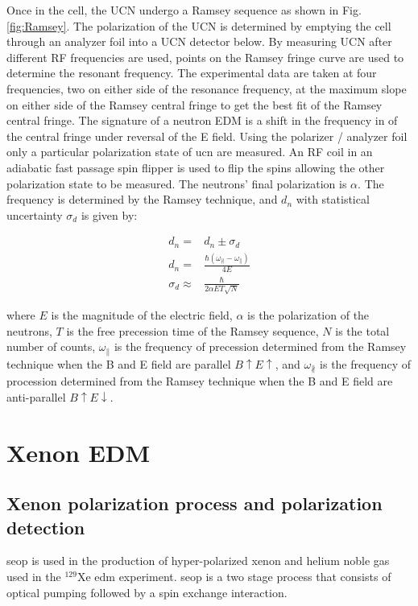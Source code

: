 Once in the cell, the UCN undergo a Ramsey sequence as shown in Fig. \ref{fig:Ramsey}. The polarization of the UCN is determined by emptying the cell through an analyzer foil into a UCN detector below.  By measuring UCN after different RF frequencies are used, points on the Ramsey fringe curve are used to determine the resonant frequency. The experimental data are taken at four frequencies, two on either side of the resonance frequency, at the maximum slope on either side of the Ramsey central fringe to get the best fit of the Ramsey central fringe. The signature of a neutron EDM is a shift in the frequency in of the central fringe under reversal of the E field. Using the polarizer / analyzer foil only a particular polarization state of \gls{ucn} are measured.  An RF coil in an adiabatic fast passage spin flipper is used to flip the spins allowing the other polarization state to be measured. The neutrons' final polarization is $\alpha$. The frequency is determined by the Ramsey technique, and $d_n$ with statistical uncertainty $\sigma_d$ is given by:

\begin{equation}
    \begin{split}
        d_n = & d_n \pm \sigma_d \\
        d_n = &\frac{\hbar(\omega_\nparallel - \omega_\parallel)}{4E}\\
        \sigma_d \approx & \frac{\hbar}{2 \alpha E T \sqrt{N}}
    \end{split}
\end{equation}

where $E$ is the magnitude of the electric field, $\alpha$ is the polarization of the neutrons, $T$ is the free precession time of the Ramsey sequence, $N$ is the total number of counts, $\omega_\parallel$ is the frequency of precession determined from the Ramsey technique when the B and E field are parallel $B\uparrow E\uparrow$, and  $\omega_\nparallel$ is the frequency of procession determined from the Ramsey technique when the B and E field are anti-parallel $B\uparrow E\downarrow$.

\section{Xenon EDM}

\subsection{Xenon polarization process and polarization detection}\label{sec:SEOP}
\Gls{seop} is used in the production of hyper-polarized xenon and helium noble gas used in the $^{129}$Xe \gls{edm} experiment. \gls{seop} is a two stage process that consists of optical pumping followed by a spin exchange interaction. 

